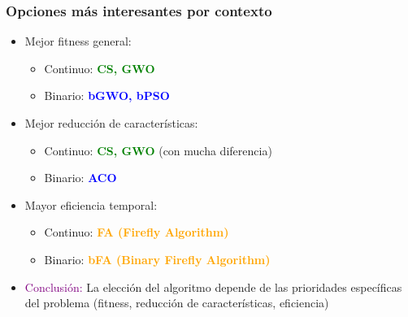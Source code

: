 \begin{frame}
    \frametitle{Opciones más interesantes por contexto}
    \begin{itemize}
        \item<1-> Mejor fitness general:
            \begin{itemize}
                \item Continuo: \textcolor{green}{\textbf{CS, GWO}}
                \item Binario: \textcolor{blue}{\textbf{bGWO, bPSO}}
            \end{itemize}
        \item<2-> Mejor reducción de características:
            \begin{itemize}
                \item Continuo: \textcolor{green}{\textbf{CS, GWO}} (con mucha diferencia)
                \item Binario: \textcolor{blue}{\textbf{ACO}}
            \end{itemize}
        \item<3-> Mayor eficiencia temporal:
            \begin{itemize}
                \item Continuo: \textcolor{orange}{\textbf{FA (Firefly Algorithm)}}
                \item Binario: \textcolor{orange}{\textbf{bFA (Binary Firefly Algorithm)}}
            \end{itemize}
        \item<4-> \textcolor{purple}{Conclusión:} La elección del algoritmo depende de las prioridades específicas del problema (fitness, reducción de características, eficiencia)
    \end{itemize}
\end{frame}